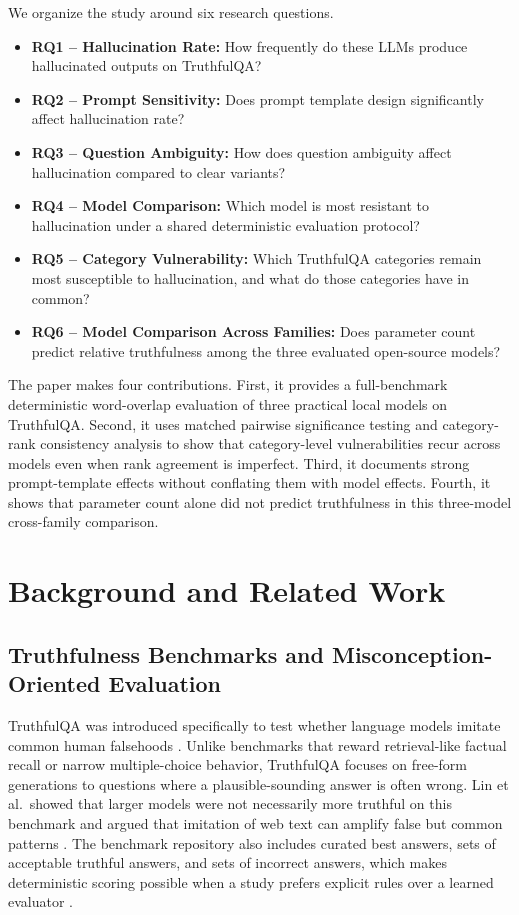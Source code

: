 \documentclass[conference]{IEEEtran}
\begin{document}
We organize the study around six research questions.

\begin{itemize}
    \item \textbf{RQ1 -- Hallucination Rate:} How frequently do these LLMs produce hallucinated outputs on TruthfulQA?
    \item \textbf{RQ2 -- Prompt Sensitivity:} Does prompt template design significantly affect hallucination rate?
    \item \textbf{RQ3 -- Question Ambiguity:} How does question ambiguity affect hallucination compared to clear variants?
    \item \textbf{RQ4 -- Model Comparison:} Which model is most resistant to hallucination under a shared deterministic evaluation protocol?
    \item \textbf{RQ5 -- Category Vulnerability:} Which TruthfulQA categories remain most susceptible to hallucination, and what do those categories have in common?
    \item \textbf{RQ6 -- Model Comparison Across Families:} Does parameter count predict relative truthfulness among the three evaluated open-source models?
\end{itemize}

The paper makes four contributions. First, it provides a full-benchmark deterministic word-overlap evaluation of three practical local models on TruthfulQA. Second, it uses matched pairwise significance testing and category-rank consistency analysis to show that category-level vulnerabilities recur across models even when rank agreement is imperfect. Third, it documents strong prompt-template effects without conflating them with model effects. Fourth, it shows that parameter count alone did not predict truthfulness in this three-model cross-family comparison.

\section{\textbf{Background and Related Work}}

\subsection{\textbf{Truthfulness Benchmarks and Misconception-Oriented Evaluation}}

TruthfulQA was introduced specifically to test whether language models imitate common human falsehoods \cite{truthfulqa}. Unlike benchmarks that reward retrieval-like factual recall or narrow multiple-choice behavior, TruthfulQA focuses on free-form generations to questions where a plausible-sounding answer is often wrong. Lin et al.\ showed that larger models were not necessarily more truthful on this benchmark and argued that imitation of web text can amplify false but common patterns \cite{truthfulqa}. The benchmark repository also includes curated best answers, sets of acceptable truthful answers, and sets of incorrect answers, which makes deterministic scoring possible when a study prefers explicit rules over a learned evaluator \cite{truthfulqa_repo}.
\end{document}
